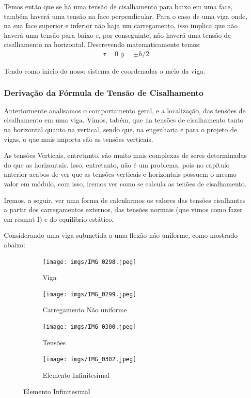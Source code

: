 \documentclass{article}
\begin{document}
Temos então que se há uma tensão de cisalhamento para baixo em uma face, também haverá uma tensão na face perpendicular. Para o caso de uma viga onde, na sua face superior e inferior não haja um carregamento, isso implica que não haverá uma tensão para baixo e, por conseguinte, não haverá uma tensão de cisalhamento na horizontal. Descrevendo matematicamente temos:
\begin{align}
    \tau = 0 \ \, y =\pm h/2
\end{align}

Tendo como início do nosso sistema de coordenadas o meio da viga.
\subsubsection{Derivação da Fórmula de Tensão de Cisalhamento}
Anteriormente analisamos o comportamento geral, e a localização, das tensões de cisalhamento em uma viga. Vimos, tabém, que ha tensões de cisalhamento tanto na horizontal quanto na vertical, sendo que, na engenharia e para o projeto de vigas, o que mais importa são as tensões verticais. 

As tensões Verticais, entretanto, são muito mais complexas de seres determinadas do que as horizontais. Isso, entretanto, não é um problema, pois no capítulo anterior acabos de ver que as tensões verticais e horizontais possuem o mesmo valor em módulo, com isso, iremos ver como se calcula as tenões de cisalhamento.

Iremos, a seguir, ver uma forma de calcularmos os valores das tensões cisalhantes a partir dos carregamentos externos, das tensões normais (que vimos como fazer em resmat I) e do equilíbrio estático.

Considerando uma viga submetida a uma flexão não uniforme, como mostrado abaixo:

\begin{figure}[h]

    \centering
    \begin{subfigure}[t]{.45\textwidth}
        \centering
        \texttt{[image: imgs/IMG\_0298.jpeg]}
        \caption{Viga}
        \label{fig:enter-label}
    \end{subfigure}
    \begin{subfigure}[t]{0.45\textwidth}
        \centering
        \texttt{[image: imgs/IMG\_0299.jpeg]}
        \caption{Carregamento Não uniforme}
        \label{fig:enter-label}
    \end{subfigure}
        \begin{subfigure}[t]{.45\textwidth}
        \centering
        \texttt{[image: imgs/IMG\_0300.jpeg]}
        \caption{Tensões}
        \label{fig:enter-label}
    \end{subfigure}
        \begin{subfigure}[t]{.45\textwidth}
        \centering
        \texttt{[image: imgs/IMG\_0302.jpeg]}
        \caption{Elemento Infinitesimal}
        \label{fig:enter-label}
    \end{subfigure}
\end{figure}
\end{document}
